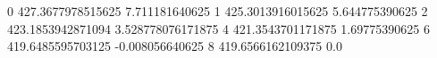 0 427.3677978515625 7.711181640625
1 425.3013916015625 5.644775390625
2 423.1853942871094 3.528778076171875
4 421.3543701171875 1.69775390625
6 419.6485595703125 -0.008056640625
8 419.6566162109375 0.0
